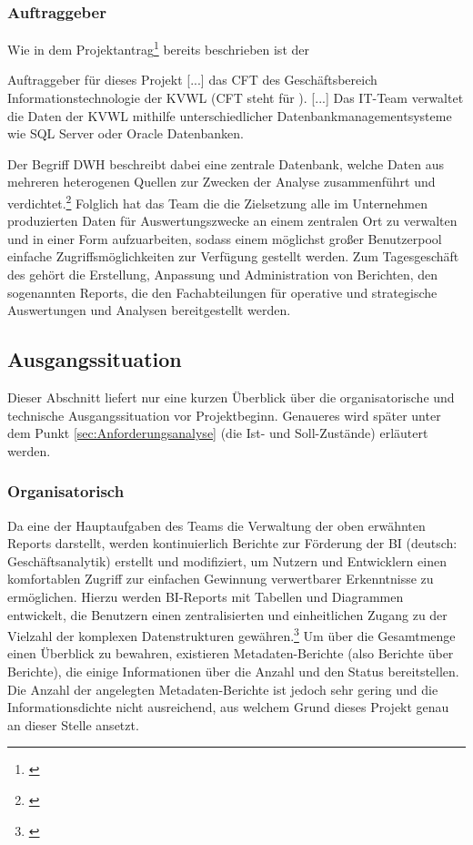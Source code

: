 \subsubsection{Auftraggeber} 
\label{sec:Auftraggeber}
Wie in dem Projektantrag\footnote{\cite{Projektantrag}} bereits beschrieben ist der
\begin{displayquote}
	Auftraggeber für dieses Projekt [...] das \acs{CFT} \teamName des Geschäftsbereich Informationstechnologie der \ac{KVWL} (\acs{CFT} steht für ).
	[...]
	Das IT-Team \teamName verwaltet die Daten der \ac{KVWL} mithilfe unterschiedlicher Datenbankmanagementsysteme wie SQL Server oder Oracle Datenbanken.
\end{displayquote}
Der Begriff \ac{DWH} beschreibt dabei eine zentrale Datenbank, welche Daten aus mehreren heterogenen Quellen zur Zwecken der Analyse zusammenführt und verdichtet.\footnote{\Vgl \cite{wiki:dwh}}
Folglich hat das Team die die Zielsetzung alle im Unternehmen produzierten Daten für Auswertungszwecke an einem zentralen Ort zu verwalten und in einer Form aufzuarbeiten, sodass einem möglichst großer Benutzerpool einfache Zugriffsmöglichkeiten zur Verfügung gestellt werden.
Zum Tagesgeschäft des \teamName gehört die Erstellung, Anpassung und Administration von Berichten, den sogenannten Reports, die den Fachabteilungen für operative und strategische Auswertungen und Analysen bereitgestellt werden.

\subsection{Ausgangssituation} 
\label{sec:Ausgangssituation}
Dieser Abschnitt liefert nur eine kurzen Überblick über die organisatorische und technische Ausgangssituation vor Projektbeginn. Genaueres wird später unter dem Punkt \ref{sec:Anforderungsanalyse} (\ua die Ist- und Soll-Zustände) erläutert werden.

\subsubsection{Organisatorisch}
\label{sec:Ausgangssituation:Organisatorisch}
Da eine der Hauptaufgaben des Teams die Verwaltung der oben erwähnten Reports darstellt, werden kontinuierlich Berichte zur Förderung der \ac{BI} (deutsch: Geschäftsanalytik) erstellt und modifiziert, um Nutzern und Entwicklern einen komfortablen Zugriff zur einfachen Gewinnung verwertbarer Erkenntnisse zu ermöglichen. Hierzu werden \ac{BI}-Reports mit Tabellen und Diagrammen entwickelt, die Benutzern einen zentralisierten und einheitlichen Zugang zu der Vielzahl der komplexen Datenstrukturen gewähren.\footnote{\Vgl \cite{Projektantrag}}
Um über die Gesamtmenge einen Überblick zu bewahren, existieren Metadaten-Berichte (also Berichte über Berichte), die einige Informationen \zB über die Anzahl und den Status bereitstellen.
Die Anzahl der angelegten Metadaten-Berichte ist jedoch sehr gering und die Informationsdichte nicht ausreichend, aus welchem Grund dieses Projekt genau an dieser Stelle ansetzt.

